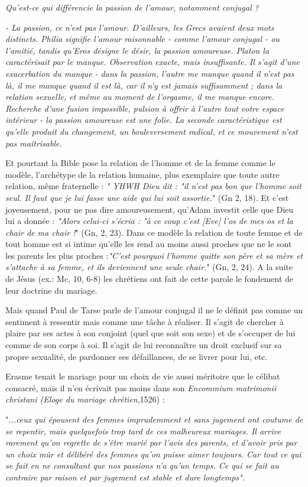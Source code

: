  \begin{displayquote}\emph{Qu'est-ce qui différencie la passion de l'amour, notamment conjugal ?} 
 
 \emph{- La passion, ce n'est pas l'amour. D'ailleurs, les Grecs avaient deux mots distincts. Philia signifie l'amour raisonnable - comme l'amour conjugal - ou l'amitié, tandis qu'Eros désigne le désir, la passion amoureuse. Platon la caractérisait par le manque. Observation exacte, mais insuffisante. Il s'agit d'une exacerbation du manque - dans la passion, l'autre me manque quand il n'est pas là, il me manque quand il est là, car il n'y est jamais suffisamment ; dans la relation sexuelle, et même au moment de l'orgasme, il me manque encore. Recherche d'une fusion impossible, pulsion à offrir à l'autre tout votre espace intérieur - la passion amoureuse est une folie. La seconde caractéristique est qu'elle produit du changement, un bouleversement radical, et ce mouvement n'est pas maîtrisable.} \end{displayquote}

 
 Et pourtant la Bible pose la relation de l'homme et de la femme comme le modèle, l'archétype de la relation humaine, plus exemplaire que toute autre relation, même fraternelle : \emph{" YHWH Dieu dit : "il n'est pas bon que l'homme soit seul. Il faut que je lui fasse une aide qui lui soit assortie.}" (Gn 2, 18). Et c'est joyeusement, pour ne pas dire amoureusement, qu'Adam investit celle que Dieu lui a donnée : \emph{"Alors celui-ci s'écria : "à ce coup c'est [Eve] l'os de mes os et la chair de ma chair !}" (Gn, 2, 23). Dans ce modèle la relation de toute femme et de tout homme est si intime qu'elle les rend au moins aussi proches que ne le sont les parents les plus proches :\emph{"C'est pourquoi l'homme quitte son père et sa mère et s'attache à sa femme, et ils deviennent une seule chair.}" (Gn, 2, 24). A la suite de Jésus (ex.: Mc, 10, 6-8) les chrétiens ont fait de cette parole le fondement de leur doctrine du mariage. 
 
 Mais quand Paul de Tarse parle de l'amour conjugal il ne le définit pas comme un sentiment à ressentir mais comme une tâche à réaliser. Il s'agit de chercher à plaire par ses actes à son conjoint (quel que soit son sexe) et de s'occuper de lui comme de son corps à soi. Il s'agit de lui reconnaître un droit exclusif sur sa propre sexualité, de pardonner ses défaillances, de se livrer pour lui, etc. 
 
 Erasme tenait le mariage pour un choix de vie aussi méritoire que le célibat consacré, mais il n'en écrivait pas moins dans son \emph{Encommium matrimonii christani (Eloge du mariage chrétien},1526) : \begin{displayquote}"\emph{...ceux qui épousent des femmes imprudemment et sans jugement ont coutume de se repentir, mais quelquefois trop tard de ces malheureux mariages. Il arrive rarement qu'on regrette de s'être marié par l'avis des parents, et d'avoir pris par un choix mûr et délibéré des femmes qu'on puisse aimer toujours. Car tout ce qui se fait en ne consultant que nos passions n'a qu'un temps. Ce qui se fait au contraire par raison et par jugement est stable et dure longtemps".  }\end{displayquote}  
 
